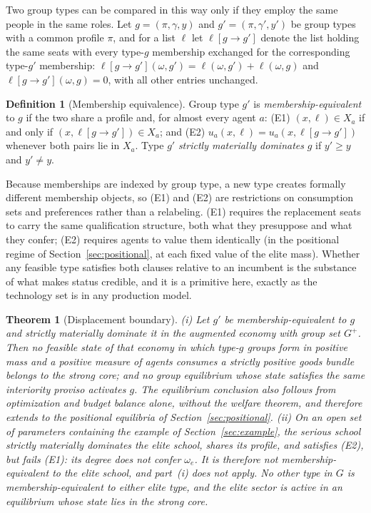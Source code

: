 \documentclass[12pt,letterpaper]{article}
\newtheorem{theorem}{Theorem}
\theoremstyle{definition}
\newtheorem{definition}{Definition}
\begin{document}
Two group types can be compared in this way only if they employ the same people in the same roles.
Let $g=(\pi,\gamma,y)$ and $g'=(\pi,\gamma',y')$ be group types with a common profile $\pi$, and for a list $\ell$ let $\ell[g\rightarrow g']$ denote the list holding the same seats with every type-$g$ membership exchanged for the corresponding type-$g'$ membership: $\ell[g\rightarrow g'](\omega,g')=\ell(\omega,g')+\ell(\omega,g)$ and $\ell[g\rightarrow g'](\omega,g)=0$, with all other entries unchanged.

\begin{definition}[Membership equivalence]\label{def:equivalence}
Group type $g'$ is \emph{membership-equivalent} to $g$ if the two share a profile and, for almost every agent $a$:
(E1) $(x,\ell)\in X_a$ if and only if $(x,\ell[g\rightarrow g'])\in X_a$; and
(E2) $u_a(x,\ell)=u_a(x,\ell[g\rightarrow g'])$ whenever both pairs lie in $X_a$.
Type $g'$ \emph{strictly materially dominates} $g$ if $y'\geq y$ and $y'\neq y$.
\end{definition}

Because memberships are indexed by group type, a new type creates formally different membership objects, so (E1) and (E2) are restrictions on consumption sets and preferences rather than a relabeling.
(E1) requires the replacement seats to carry the same qualification structure, both what they presuppose and what they confer; (E2) requires agents to value them identically (in the positional regime of Section~\ref{sec:positional}, at each fixed value of the elite mass).
Whether any feasible type satisfies both clauses relative to an incumbent is the substance of what makes status credible, and it is a primitive here, exactly as the technology set is in any production model.

\begin{theorem}[Displacement boundary]\label{thm:displacement}
(i) Let $g'$ be membership-equivalent to $g$ and strictly materially dominate it in the augmented economy with group set $G^+$.
Then no feasible state of that economy in which type-$g$ groups form in positive mass and a positive measure of agents consumes a strictly positive goods bundle belongs to the strong core; and no group equilibrium whose state satisfies the same interiority proviso activates $g$.
The equilibrium conclusion also follows from optimization and budget balance alone, without the welfare theorem, and therefore extends to the positional equilibria of Section~\ref{sec:positional}.
(ii) On an open set of parameters containing the example of Section~\ref{sec:example}, the serious school strictly materially dominates the elite school, shares its profile, and satisfies (E2), but fails (E1): its degree does not confer $\omega_e$.
It is therefore not membership-equivalent to the elite school, and part~(i) does not apply.
No other type in $G$ is membership-equivalent to either elite type, and the elite sector is active in an equilibrium whose state lies in the strong core.
\end{theorem}
\end{document}
